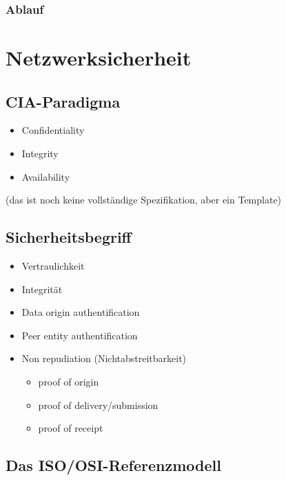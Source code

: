 \documentclass[a4paper,twoside,DIV15,BCOR12mm]{scrbook}
\begin{document}
\subsection{Ablauf}

	
	
\chapter{Netzwerksicherheit}

\section{CIA-Paradigma}

\begin{itemize}
	\item Confidentiality
	\item Integrity
	\item Availability
\end{itemize}

(das ist noch keine vollständige Spezifikation, aber ein \glqq Template\grqq)

\section{Sicherheitsbegriff}

\begin{itemize}
	\item Vertraulichkeit
	\item Integrität
	\item Data origin authentification
	\item Peer entity authentification
	\item Non repudiation (Nichtabstreitbarkeit)
		\begin{itemize}
			\item proof of origin
			\item proof of delivery/submission
			\item proof of receipt
		\end{itemize}
\end{itemize}

\section{Das ISO/OSI-Referenzmodell}
\end{document}
